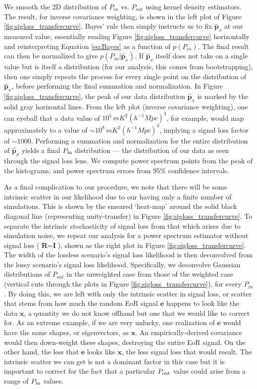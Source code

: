 \documentclass[preprint2,numberedappendix,tighten]{aastex6}  %
\newcommand{\phat}{\hat{\mathbf{p}}}
\begin{document}
We smooth the 2D distribution of $P_{in}$ vs. $P_{out}$ using kernel density estimators. The result, for inverse covariance weighting, is shown in the left plot of Figure \ref{fig:sigloss_transfercurve}. Bayes' rule then simply instructs us to fix $\phat_{x}$ at our measured value, essentially reading Figure \ref{fig:sigloss_transfercurve} horizontally and reinterpreting Equation \eqref{eq:Bayes} as a function of $p(P_{in})$. The final result can then be normalized to give $p(P_{in} | \phat_{x})$. If $\phat_{x}$ itself does not take on a single value but is itself a distribution (for our analysis, this comes from bootstrapping), then one simply repeats the process for every single point on the distribution of $\phat_{x}$, before performing the final summation and normalization. In Figure \ref{fig:sigloss_transfercurve}, the peak of our data distribution $
\hat{\textbf{p}}_{x}$ is marked by the solid gray horizontal lines. From the left plot (inverse covariance weighting), one can eyeball that a data value of $10^{5} \, mK^{2} (h^{-1} Mpc)^{3}$, for example, would map approximately to a 
value of $\sim10^{8} \, mK^{2} (h^{-1} Mpc)^{3}$, implying a signal loss factor of $\sim1000$. Performing a summation and normalization for the entire distribution of $\hat{\textbf{p}}_{x}$ yields a final $P_{\rm in}$ distribution --- the distribution of our data as seen through the signal loss lens. We compute power spectrum points from the peak of the histograms, and power spectrum errors from $95\%$ confidence intervals.

As a final complication to our procedure, we note that there will be some intrinsic scatter in our likelihood due to our having only a finite number of simulations. This is shown by the smeared `heat-map' around the solid black diagonal line (representing unity-transfer) in Figure \ref{fig:sigloss_transfercurve}. To separate the intrinsic stochasticity of signal loss from that which arises due to simulation noise, we repeat our analysis for a power spectrum estimator without signal loss ($\textbf{R} = \textbf{I}$), shown as the right plot in Figure \ref{fig:sigloss_transfercurve}. The width of the lossless scenario's signal loss likelihood is then deconvolved from the lossy scenario's signal loss likelihood. Specifically, we deconvolve Gaussian distributions of $P_{out}$ in the unweighted case from those of the weighted case (vertical cuts through the plots in Figure \ref{fig:sigloss_transfercurve}), for every $P_{in}$. By doing this, we are left with only the intrinsic scatter in signal loss, or scatter that stems from how much the random EoR signal $\textbf{e}$ happens to 
look like the data $\textbf{x}$, a quantity we do not know offhand but one that we would like to correct for. As an extreme example, if we are very unlucky, one realization of $\textbf{e}$ would have the same shapes, or eigenvectors, as $\textbf{x}$. An empirically-derived covariance would then down-weight these shapes, destroying the entire EoR signal. On the other hand, the less that $\textbf{e}$ looks like $\textbf{x}$, the less signal loss that would result. The intrinsic scatter we can get is not a dominant factor in this case but it is important to correct for the fact that a particular $P_{\rm out}$ value could arise from a range of $P_{\rm in}$ values. 
\end{document}
